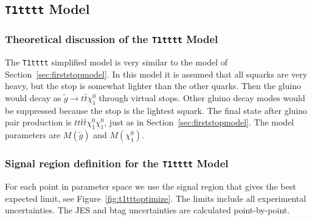 

\clearpage


\subsection{{\tt T1tttt} Model}
\label{t1ttmodel}

\subsubsection{Theoretical discussion of the {\tt T1tttt} Model}
\label{sec:t1tttheory}
The {\tt T1tttt} simplified model\cite{T1tttt} is very similar to the model of 
Section~\ref{sec:firststopmodel}.  In this model it is assumed that all squarks 
are very heavy, but the stop is somewhat lighter than the other 
quarks\cite{stopVirtual}\cite{stopVirtualPRD}.
Then the gluino would decay as $\widetilde{g} \to t\bar{t}\chi_1^0$ through virtual stops.
Other gluino decay modes would be suppressed because the stop is the lightest squark.
The final state after gluino pair production is $tt\bar{t}\bar{t}\chi_1^0\chi_1^0$,
just as in Section~\ref{sec:firststopmodel}.
The model parameters are $M(\widetilde{g})$ and $M(\chi_1^0)$.



\subsubsection{Signal region definition for the {\tt T1tttt} Model}
\label{sec:t1ttttdefinition}
For each point in parameter space we use the signal region that gives
the best expected limit, see Figure~\ref{fig:t1tttoptimize}.
The limits include all experimental 
uncertainties.   The JES and btag uncertainties are calculated point-by-point.


